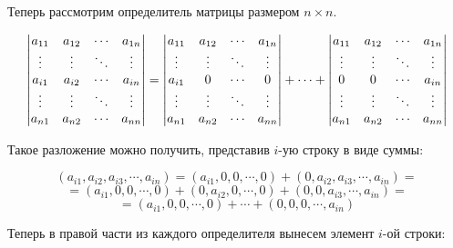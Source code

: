 Теперь рассмотрим определитель матрицы размером $n\times n$.

$$
\begin{vmatrix}
a_{11} & a_{12} & \cdots & a_{1n} \\
\vdots & \vdots & \ddots & \vdots \\
a_{i1} & a_{i2} & \cdots & a_{in} \\
\vdots & \vdots & \ddots & \vdots \\
a_{n1} & a_{n2} & \cdots & a_{nn}
\end{vmatrix}
=
\begin{vmatrix}
a_{11} & a_{12} & \cdots & a_{1n} \\
\vdots & \vdots & \ddots & \vdots \\
a_{i1} &    0   & \cdots &    0   \\
\vdots & \vdots & \ddots & \vdots \\
a_{n1} & a_{n2} & \cdots & a_{nn}
\end{vmatrix}
+ \cdots +
\begin{vmatrix}
a_{11} & a_{12} & \cdots & a_{1n} \\
\vdots & \vdots & \ddots & \vdots \\
   0   &    0   & \cdots & a_{in} \\
\vdots & \vdots & \ddots & \vdots \\
a_{n1} & a_{n2} & \cdots & a_{nn}
\end{vmatrix}
$$

Такое разложение можно получить, представив $i$-ую строку в виде суммы:

$$
\left(a_{i1},a_{i2},a_{i3},\cdots,a_{in}\right) =
\left(a_{i1},   0  ,   0  ,\cdots,   0  \right) +
\left(   0  ,a_{i2},a_{i3},\cdots,a_{in}\right) =
$$ $$
=
\left(a_{i1},   0  ,   0  ,\cdots,   0  \right) +
\left(   0  ,a_{i2},   0  ,\cdots,   0  \right) +
\left(   0  ,   0  ,a_{i3},\cdots,a_{in}\right) =
$$ $$
=
\left(a_{i1},   0  ,   0  ,\cdots,   0  \right) +
\cdots                                          +
\left(   0  ,   0  ,   0  ,\cdots,a_{in}\right)
$$

Теперь в правой части из каждого определителя вынесем элемент $i$-ой
строки:

